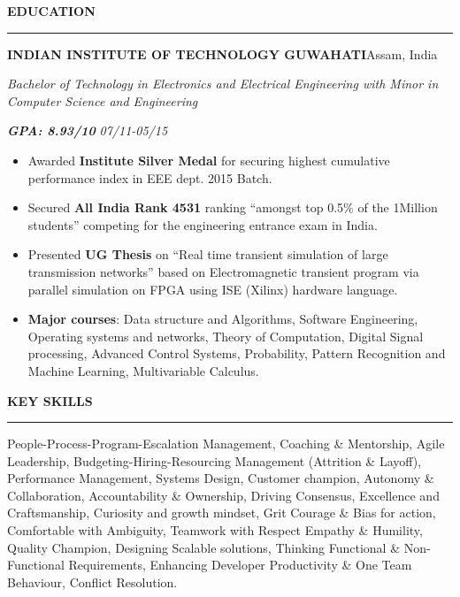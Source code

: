 \documentclass[10pt,letterpaper]{article}
\newlength{\blockindent}   \setlength{\blockindent}{11.5pt}
\newlength{\eduindent}     \setlength{\eduindent}{11.5pt}
\newlength{\textrightinset}\setlength{\textrightinset}{5.25pt}   %
\newcommand{\bd}[1]{\textbf{#1}}
\newcommand{\sectionbar}[3]{%
  \par\vspace{#1}%
  \centerline{\bfseries\fontsize{10.5}{12}\selectfont #3}%
  \par\nointerlineskip\vspace{3pt}%
  \noindent\rule{\linewidth}{#2}\par\vspace{1pt}}
\newcommand{\sect}[2][9pt]{\sectionbar{#1}{1.3pt}{#2}}
\newcommand{\sectthin}[2][9pt]{\sectionbar{#1}{0.5pt}{#2}}
\newenvironment{indented}{%
  \list{}{\leftmargin=\blockindent\rightmargin=\textrightinset\topsep=0pt\partopsep=0pt
          \parsep=0pt\itemsep=0pt\listparindent=0pt}\item\relax}{\endlist}
\begin{document}
\sectthin[13.7pt]{EDUCATION}
\par\vspace{-1pt}
\noindent\hspace*{\eduindent}\textbf{INDIAN INSTITUTE OF TECHNOLOGY GUWAHATI}\hfill Assam, India\par
\vspace{2pt}
\noindent\hspace*{\eduindent}%
\parbox[t]{362pt}{\textcolor{rolecolor}{\textit{Bachelor of Technology in Electronics and
  Electrical Engineering with Minor in Computer Science and Engineering}}}%
\hspace{6pt}\textbf{\textit{GPA: 8.93/10}}\hfill
\textcolor{rolecolor}{\textit{07/11-05/15}}\par
\vspace{2pt}
\begin{itemize}
\item Awarded \bd{Institute Silver Medal} for securing highest cumulative performance index
  in EEE dept. 2015 Batch.
\item Secured \bd{All India Rank 4531} ranking ``amongst top 0.5\% of the 1Million
  students'' competing for the engineering entrance exam in India.
\item Presented \bd{UG Thesis} on ``Real time transient simulation of large transmission
  networks'' based on Electromagnetic transient program via parallel simulation on FPGA
  using ISE (Xilinx) hardware language.
\item \bd{Major courses}: Data structure and Algorithms, Software Engineering, Operating
  systems and networks, Theory of Computation, Digital Signal processing, Advanced Control
  Systems, Probability, Pattern Recognition and Machine Learning, Multivariable Calculus.
\end{itemize}

\sect[10pt]{KEY SKILLS}
\vspace{-1pt}
\begin{indented}
People-Process-Program-Escalation Management, Coaching \& Mentorship, Agile Leadership,
Budgeting-Hiring-Resourcing Management (Attrition \& Layoff), Performance Management,
Systems Design, Customer champion, Autonomy \& Collaboration, Accountability \& Ownership,
Driving Consensus, Excellence and Craftsmanship, Curiosity and growth mindset, Grit Courage
\& Bias for action, Comfortable with Ambiguity, Teamwork with Respect Empathy \& Humility,
Quality Champion, Designing Scalable solutions, Thinking Functional \& Non-Functional
Requirements, Enhancing Developer Productivity \& One Team Behaviour, Conflict Resolution.
\end{indented}
\end{document}
